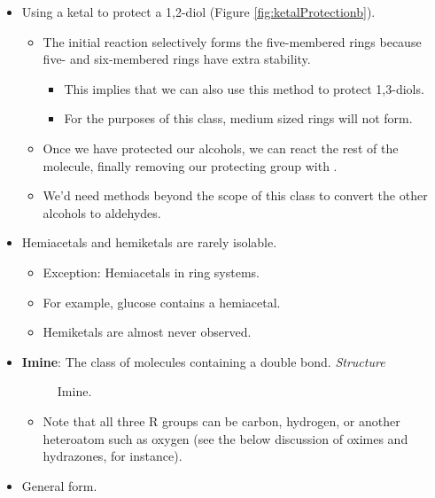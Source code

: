 \documentclass[../notes.tex]{subfiles}
\begin{document}
\begin{itemize}
\begin{itemize}
\begin{itemize}
        \end{itemize}
    \end{itemize}
    \item Using a ketal to protect a 1,2-diol (Figure \ref{fig:ketalProtectionb}).
    \begin{itemize}
        \item The initial reaction selectively forms the five-membered rings because five- and six-membered rings have extra stability.
        \begin{itemize}
            \item This implies that we can also use this method to protect 1,3-diols.
            \item For the purposes of this class, medium sized rings will not form.
        \end{itemize}
        \item Once we have protected our alcohols, we can react the rest of the molecule, finally removing our protecting group with .
        \item We'd need methods beyond the scope of this class to convert the other alcohols to aldehydes.
    \end{itemize}
    \item Hemiacetals and hemiketals are rarely isolable.
    \begin{itemize}
        \item Exception: Hemiacetals in ring systems.
        \item For example, glucose contains a hemiacetal.
        \item Hemiketals are almost never observed.
    \end{itemize}
    \item \textbf{Imine}: The class of molecules containing a  double bond. \emph{Structure}
    \begin{figure}[h!]
        \centering
        \footnotesize
        \caption{Imine.}
        \label{fig:imine}
    \end{figure}
    \begin{itemize}
        \item Note that all three R groups can be carbon, hydrogen, or another heteroatom such as oxygen (see the below discussion of oximes and hydrazones, for instance).
    \end{itemize}
    \item General form.
    \begin{center}

\end{center}
\end{itemize}
\end{document}
